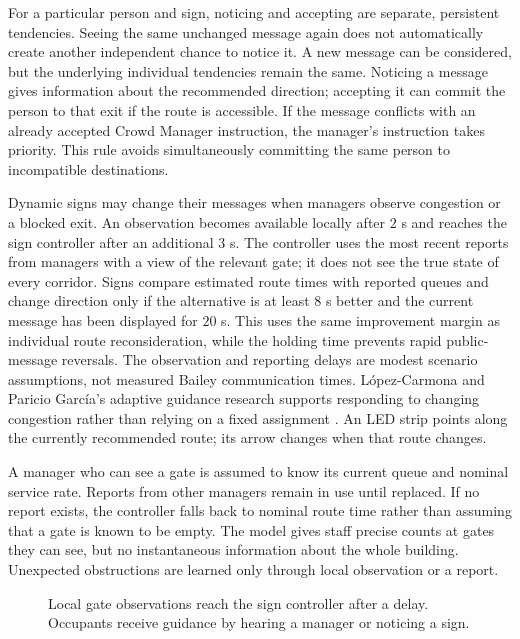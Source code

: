 \documentclass[11pt,a4paper]{article}
\begin{document}
For a particular person and sign, noticing and accepting are separate, persistent tendencies. Seeing the same unchanged message again does not automatically create another independent chance to notice it. A new message can be considered, but the underlying individual tendencies remain the same. Noticing a message gives information about the recommended direction; accepting it can commit the person to that exit if the route is accessible. If the message conflicts with an already accepted Crowd Manager instruction, the manager's instruction takes priority. This rule avoids simultaneously committing the same person to incompatible destinations.

Dynamic signs may change their messages when managers observe congestion or a blocked exit. An observation becomes available locally after $2$ s and reaches the sign controller after an additional $3$ s. The controller uses the most recent reports from managers with a view of the relevant gate; it does not see the true state of every corridor. Signs compare estimated route times with reported queues and change direction only if the alternative is at least $8$ s better and the current message has been displayed for $20$ s. This uses the same improvement margin as individual route reconsideration, while the holding time prevents rapid public-message reversals. The observation and reporting delays are modest scenario assumptions, not measured Bailey communication times. L\'opez-Carmona and Paricio Garc\'ia's adaptive guidance research supports responding to changing congestion rather than relying on a fixed assignment \cite{cellevac}. An LED strip points along the currently recommended route; its arrow changes when that route changes.

A manager who can see a gate is assumed to know its current queue and nominal service rate. Reports from other managers remain in use until replaced. If no report exists, the controller falls back to nominal route time rather than assuming that a gate is known to be empty. The model gives staff precise counts at gates they can see, but no instantaneous information about the whole building. Unexpected obstructions are learned only through local observation or a report.

\begin{figure}[htbp]
\centering
{}
\caption{Local gate observations reach the sign controller after a delay. Occupants receive guidance by hearing a manager or noticing a sign.}
\label{fig:information}
\end{figure}
\end{document}
